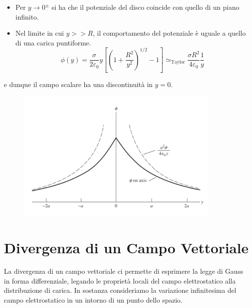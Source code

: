 \begin{itemize}
	\item Per $y \to 0^{\pm}  $ si ha che il potenziale del disco coincide con quello di un piano infinito.
	\item Nel limite in cui $y >> R$, il comportamento del potenziale \`e uguale a quello di una carica puntiforme.
	\begin{equation*}
		\phi(y) = \frac{\sigma}{2 \varepsilon_0}y \left [ \left ( 1+ \frac{R^2}{y^2}\right)^{1/2} - 1\right ] \simeq_{\text{Taylor}} \frac{\sigma R^2}{4  \varepsilon_0} \frac{1}{y}
	\end{equation*}
\end{itemize}
e dunque il campo scalare ha una discontinuit\`a in $y =0 $.
 
\begin{figure}[!ht]
\vspace{0.1in}
\includegraphics[width = 10cm]{images/disco_discont.png}	
\centering
\vspace{0.1in}
\end{figure}

\section{Divergenza di un  Campo Vettoriale}

La divergenza di un campo vettoriale ci permette di esprimere la legge di Gauss in forma differenziale, legando le propriet\`a locali del campo elettrostatico alla distribuzione di carica. In sostanza consideriamo la variazione infinitesima del campo elettrostatico in un intorno di un punto dello spazio.
\\

